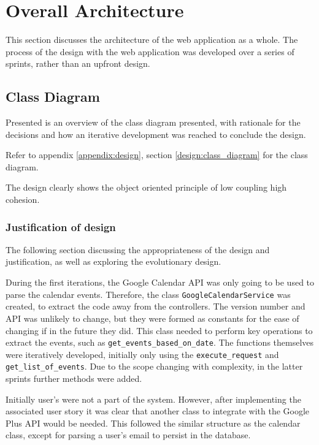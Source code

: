 \section{Overall Architecture}
This section discusses the architecture of the web application as a whole. The process of the design with the web application was developed over a series of sprints, rather than an upfront design.

\subsection{Class Diagram}
\label{architecture:class}
Presented is an overview of the class diagram presented, with rationale for the decisions and how an iterative development was reached to conclude the design.

Refer to appendix \ref{appendix:design}, section \ref{design:class_diagram} for the class diagram.

The design clearly shows the object oriented principle of low coupling high cohesion.

\subsubsection{Justification of design}
The following section discussing the appropriateness of the design and justification, as well as exploring the evolutionary design.

During the first iterations, the Google Calendar API was only going to be used to parse the calendar events. Therefore, the class \texttt{GoogleCalendarService} was created, to extract the code away from the controllers. The version number and API was unlikely to change, but they were formed as constants for the ease of changing if in the future they did. This class needed to perform key operations to extract the events, such as \texttt{get_events_based_on_date}. The functions themselves were iteratively developed, initially only using the \texttt{execute_request} and \texttt{get_list_of_events}. Due to the scope changing with complexity, in the latter sprints  further methods were added.

Initially user's were not a part of the system. However, after implementing the associated user story it was clear that another class to integrate with the Google Plus API would be needed. This followed the similar structure as the calendar class, except for parsing a user's email to persist in the database.

